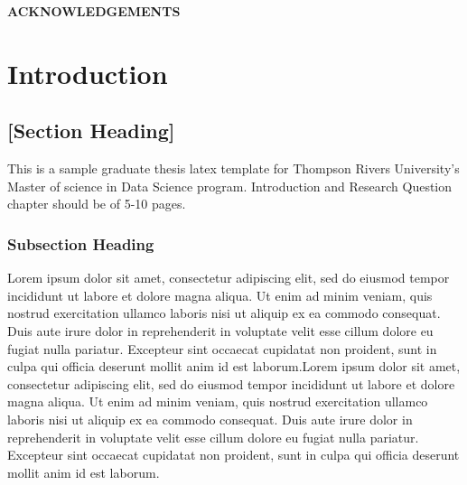 \documentclass[12pt,a4 paper,openany,oneside, title page]{book}
\begin{document}
\newpage
\thispagestyle{fancy}
\renewcommand{\headrulewidth}{0pt}
\cfoot{\thepage}
\centering
{\bfseries ACKNOWLEDGEMENTS}

\justifying
{}

\tableofcontents
\listoffigures
\listoftables
\newpage

\pagestyle{fancy}
\fancyhf{}
\renewcommand{\headrulewidth}{0pt}
\fancyfoot[R]{\thepage}
\renewcommand{\footrulewidth}{0pt}



\chapter{Introduction}

\section{[Section Heading]}
This is a sample graduate thesis latex template for Thompson Rivers University's Master of science in Data Science program. Introduction and Research Question chapter should be of 5-10 pages.

\subsection{Subsection Heading}
Lorem ipsum dolor sit amet, consectetur adipiscing elit, sed do eiusmod tempor incididunt ut labore et dolore magna aliqua. Ut enim ad minim veniam, quis nostrud exercitation ullamco laboris nisi ut aliquip ex ea commodo consequat. Duis aute irure dolor in reprehenderit in voluptate velit esse cillum dolore eu fugiat nulla pariatur. Excepteur sint occaecat cupidatat non proident, sunt in culpa qui officia deserunt mollit anim id est laborum.Lorem ipsum dolor sit amet, consectetur adipiscing elit, sed do eiusmod tempor incididunt ut labore et dolore magna aliqua. Ut enim ad minim veniam, quis nostrud exercitation ullamco laboris nisi ut aliquip ex ea commodo consequat. Duis aute irure dolor in reprehenderit in voluptate velit esse cillum dolore eu fugiat nulla pariatur. Excepteur sint occaecat cupidatat non proident, sunt in culpa qui officia deserunt mollit anim id est laborum.
\end{document}
